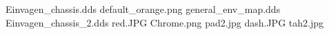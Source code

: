 Einvagen_chassis.dds
default_orange.png
general_env_map.dds
Einvagen_chassis_2.dds
red.JPG
Chrome.png
pad2.jpg
dash.JPG
tah2.jpg
